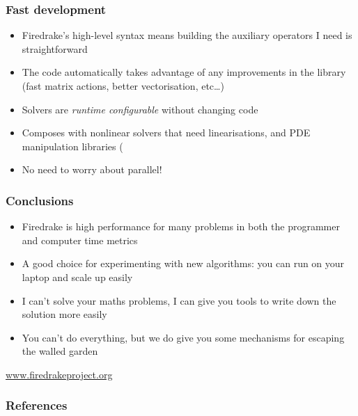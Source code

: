 \documentclass[presentation]{beamer}
\begin{document}
\begin{frame}
  \frametitle{Fast development}

  \begin{itemize}
  \item Firedrake's high-level syntax means building the auxiliary
    operators I need is straightforward
  \item The code automatically takes advantage of any improvements in
    the library (fast matrix actions, better vectorisation, etc\dots)
  \item Solvers are \emph{runtime configurable} without changing code
  \item Composes with nonlinear solvers that need linearisations, and
    PDE manipulation libraries (
  \item No need to worry about parallel!
  \end{itemize}
\end{frame}

\begin{frame}
  \frametitle{Conclusions}
  \begin{itemize}
  \item Firedrake is high performance for many problems in both
    the programmer and computer time metrics
  \item A good choice for experimenting with new algorithms: you can
    run on your laptop and scale up easily
  \item I can't solve your maths problems, I can give you tools to
    write down the solution more easily
  \item You can't do everything, but we do give you
    some mechanisms for escaping the walled garden
  \end{itemize}
  \begin{center}
    \url{www.firedrakeproject.org}
  \end{center}
\end{frame}

\appendix
\begin{frame}[t,allowframebreaks]
  \frametitle{References}
  \printbibliography[heading=none]
\end{frame}
\end{document}
